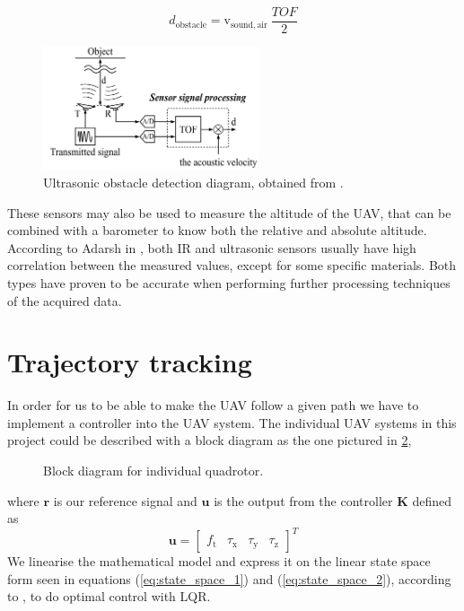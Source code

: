 \documentclass[journal, twoside]{IEEEtran}
\newcommand*{\subb}[1]{_{\mathrm{#1}}}
\begin{document}
	\begin{equation} \label{eq:ultrasonic_formula}
	d\subb{obstacle} = \textrm{v}\subb{sound, air} \ \frac{TOF}{2}
	\end{equation}
	\begin{figure}[h]
		\centering
		\includegraphics[width=2.5in]{ultrasonic2}
		\caption{Ultrasonic obstacle detection diagram, obtained from \cite{hirata2008cross}.}
		\label{fig:ultrasonic}
	\end{figure}
	
	These sensors may also be used to measure the altitude of the UAV, that can be combined with a barometer to know both the relative and absolute altitude. According to Adarsh in \cite{AdarshS2016PcoI}, both IR and ultrasonic sensors usually have high correlation between the measured values, except for some specific materials. Both types have proven to be accurate when performing further processing techniques of the acquired data.
	
	
	\section{Trajectory tracking}
	In order for us to be able to make the UAV follow a given path we have to implement a controller into the UAV system. The individual UAV systems in this project could be described with a block diagram as the one pictured in \figurename{\ref{fig:block_diagram}},
	\begin{figure}[h]
		\centering
		
		\caption{Block diagram for individual quadrotor.}
		\label{fig:block_diagram}
	\end{figure}	
	where $\bm{r}$ is our reference signal and $\bm{u}$ is the output from the controller $\bm{K}$ defined as
	\begin{equation} \label{eq:uvect}
		\bm{u} = \left[ {\begin{array}{cccc}	
    f\subb{t} & \tau\subb{x} & \tau\subb{y} & \tau\subb{z}
	\end{array} } \right]^T
	\end{equation}
	 We linearise the mathematical model and express it on the linear state space form seen in equations (\ref{eq:state_space_1}) and (\ref{eq:state_space_2}), according to \cite{SabatinoFrancesco2015Qcmn},  to do optimal control with LQR.
\end{document}

